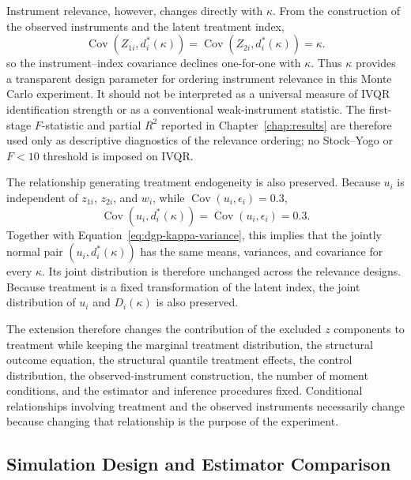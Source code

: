 Instrument relevance, however, changes directly with \(\kappa\). From the construction of the observed instruments and the latent treatment index,
\begin{equation}
  \operatorname{Cov}\!\left(Z_{1i},d_i^*(\kappa)\right)
  =\operatorname{Cov}\!\left(Z_{2i},d_i^*(\kappa)\right)
  =\kappa.
  \label{eq:dgp-kappa-relevance}
\end{equation}
so the instrument--index covariance declines one-for-one with \(\kappa\). Thus \(\kappa\) provides a transparent design parameter for ordering instrument relevance in this Monte Carlo experiment. It should not be interpreted as a universal measure of IVQR identification strength or as a conventional weak-instrument statistic. The first-stage \(F\)-statistic and partial \(R^2\) reported in Chapter~\ref{chap:results} are therefore used only as descriptive diagnostics of the relevance ordering; no Stock--Yogo or \(F<10\) threshold is imposed on IVQR.

The relationship generating treatment endogeneity is also preserved. Because \(u_i\) is independent of \(z_{1i}\), \(z_{2i}\), and \(w_i\), while \(\operatorname{Cov}(u_i,\epsilon_i)=0.3\),
\begin{equation}
  \operatorname{Cov}\!\left(u_i,d_i^*(\kappa)\right)
  =\operatorname{Cov}(u_i,\epsilon_i)=0.3.
  \label{eq:dgp-kappa-endogeneity}
\end{equation}
Together with Equation~\eqref{eq:dgp-kappa-variance}, this implies that the jointly normal pair
\((u_i,d_i^*(\kappa))\) has the same means, variances, and covariance for every \(\kappa\). Its joint distribution is therefore unchanged across the relevance designs. Because treatment is a fixed transformation of the latent index, the joint distribution of \(u_i\) and \(D_i(\kappa)\) is also preserved.

The extension therefore changes the contribution of the excluded \(z\) components to treatment while keeping the marginal treatment distribution, the structural outcome equation, the structural quantile treatment effects, the control distribution, the observed-instrument construction, the number of moment conditions, and the estimator and inference procedures fixed. Conditional relationships involving treatment and the observed instruments necessarily change because changing that relationship is the purpose of the experiment.

\subsection{Simulation Design and Estimator Comparison}

